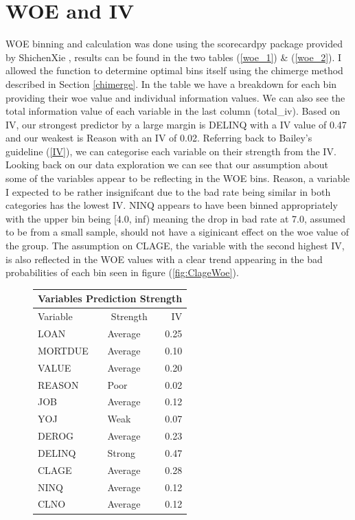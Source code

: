 \section{WOE and IV}

WOE binning and calculation was done using the scorecardpy package provided by ShichenXie \cite{scorecardpy},  results can be found in the two tables (\ref{woe_1}) \& (\ref{woe_2}). I allowed the function to determine optimal bins itself using the chimerge method described in Section \ref{chimerge}. In the table we have a breakdown for each bin providing their woe value and individual information values. We can also see the total information value of each variable in the last column (total\_iv). Based on IV,  our strongest predictor by a large margin is DELINQ with a IV value of 0.47 and our weakest is Reason with an IV of 0.02. Referring back to Bailey's guideline (\ref{IV})\cite{bailey2004credit}, we can categorise each variable on their strength from the IV.\\

Looking back on our data exploration we can see that our assumption about some of the variables appear to be reflecting in the WOE bins. Reason, a variable I expected to be rather insignifcant due to the bad rate being similar in both categories has the lowest IV. NINQ appears to have been binned appropriately with the upper bin being [4.0, inf) meaning the drop in bad rate at 7.0, assumed to be from a small sample, should not have a siginicant effect on the woe value of the group. The assumption on CLAGE, the variable with the second highest IV, is also reflected in the WOE values with a clear trend appearing in the bad probabilities of each bin seen in figure (\ref{fig:ClageWoe}).

\begin{figure}[ht]\label{Table2}
	\centering
	\renewcommand{\arraystretch}{1.25}
	\begin{tabular}{llr}
	\multicolumn{3}{c}{Variables Prediction Strength}\\
	\hline
	Variable & \multicolumn{1}{c}{Strength} & IV\\ 
	\hline
	LOAN & Average & 0.25\\
	MORTDUE & Average & 0.10\\
	VALUE & Average & 0.20\\
	REASON & Poor & 0.02\\
	JOB & Average & 0.12\\
	YOJ & Weak & 0.07\\
	DEROG & Average & 0.23\\
	DELINQ & Strong & 0.47\\
	CLAGE & Average & 0.28\\
	NINQ & Average & 0.12\\
	CLNO & Average & 0.12\\
	\bottomrule
	\end{tabular}
\end{figure}

